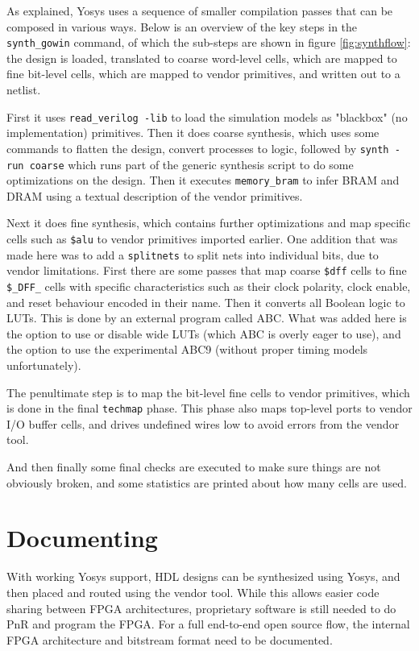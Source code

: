 \documentclass{article}
\begin{document}
As explained, Yosys uses a sequence of smaller compilation passes that can be composed in various ways. Below is an overview of the key steps in the \texttt{synth\_gowin} command, of which the sub-steps are shown in figure \ref{fig:synthflow}: the design is loaded, translated to coarse word-level cells, which are mapped to fine bit-level cells, which are mapped to vendor primitives, and written out to a netlist.

First it uses \texttt{read\_verilog -lib} to load the simulation models as "blackbox" (no implementation) primitives. Then it does coarse synthesis, which uses some commands to flatten the design, convert processes to logic, followed by \texttt{synth -run coarse} which runs part of the generic synthesis script to do some optimizations on the design. Then it executes \texttt{memory\_bram} to infer BRAM and DRAM using a textual description of the vendor primitives.

Next it does fine synthesis, which contains further optimizations and map specific cells such as \texttt{\$alu} to vendor primitives imported earlier. One addition that was made here was to add a \texttt{splitnets} to split nets into individual bits, due to vendor limitations. First there are some passes that map coarse \texttt{\$dff} cells to fine \texttt{\$\_DFF\_} cells with specific characteristics such as their clock polarity, clock enable, and reset behaviour encoded in their name. Then it converts all Boolean logic to LUTs. This is done by an external program called ABC. What was added here is the option to use or disable wide LUTs (which ABC is overly eager to use), and the option to use the experimental ABC9 (without proper timing models unfortunately).

The penultimate step is to map the bit-level fine cells to vendor primitives, which is done in the final \texttt{techmap} phase. This phase also maps top-level ports to vendor I/O buffer cells, and drives undefined wires low to avoid errors from the vendor tool.

And then finally some final checks are executed to make sure things are not obviously broken, and some statistics are printed about how many cells are used.

\section{Documenting}

With working Yosys support, HDL designs can be synthesized using Yosys, and then placed and routed using the vendor tool. While this allows easier code sharing between FPGA architectures, proprietary software is still needed to do PnR and program the FPGA. For a full end-to-end open source flow, the internal FPGA architecture and bitstream format need to be documented.
\end{document}
